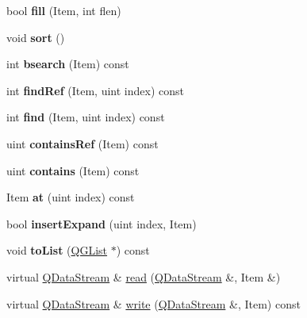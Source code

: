\begin{DoxyCompactItemize}
\item 
\hypertarget{class_q_g_vector_af9dcbef812d6f8dd7a6390cdead99a96}{bool {\bfseries fill} (Item, int flen)}\label{class_q_g_vector_af9dcbef812d6f8dd7a6390cdead99a96}

\item 
\hypertarget{class_q_g_vector_a47fdc9eea42b6975cdc835bb2e08810e}{void {\bfseries sort} ()}\label{class_q_g_vector_a47fdc9eea42b6975cdc835bb2e08810e}

\item 
\hypertarget{class_q_g_vector_a4d620afb19f972621dd2c276bfa7aa47}{int {\bfseries bsearch} (Item) const }\label{class_q_g_vector_a4d620afb19f972621dd2c276bfa7aa47}

\item 
\hypertarget{class_q_g_vector_ac88a052b06ba7050cf146f06ccb80981}{int {\bfseries find\-Ref} (Item, uint index) const }\label{class_q_g_vector_ac88a052b06ba7050cf146f06ccb80981}

\item 
\hypertarget{class_q_g_vector_a87e5b0a8391a6f8f3ea0f4019970ad6f}{int {\bfseries find} (Item, uint index) const }\label{class_q_g_vector_a87e5b0a8391a6f8f3ea0f4019970ad6f}

\item 
\hypertarget{class_q_g_vector_af5fa25c58c8c12a0f619e3a0d3a1c2fd}{uint {\bfseries contains\-Ref} (Item) const }\label{class_q_g_vector_af5fa25c58c8c12a0f619e3a0d3a1c2fd}

\item 
\hypertarget{class_q_g_vector_aeea75e0704a1e19f64d31524d8d071b6}{uint {\bfseries contains} (Item) const }\label{class_q_g_vector_aeea75e0704a1e19f64d31524d8d071b6}

\item 
\hypertarget{class_q_g_vector_a2e4350ee269e6b3e1163f8900b6dcaa4}{Item {\bfseries at} (uint index) const }\label{class_q_g_vector_a2e4350ee269e6b3e1163f8900b6dcaa4}

\item 
\hypertarget{class_q_g_vector_a0593f5d2e2a819bc5833e2f712dc8dd2}{bool {\bfseries insert\-Expand} (uint index, Item)}\label{class_q_g_vector_a0593f5d2e2a819bc5833e2f712dc8dd2}

\item 
\hypertarget{class_q_g_vector_a6f25011ce752ae7a97effcf72993cb93}{void {\bfseries to\-List} (\hyperlink{class_q_g_list}{Q\-G\-List} $\ast$) const }\label{class_q_g_vector_a6f25011ce752ae7a97effcf72993cb93}

\item 
virtual \hyperlink{class_q_data_stream}{Q\-Data\-Stream} \& \hyperlink{class_q_g_vector_ad2158ff020e4b3a5832f58cb41ea435e}{read} (\hyperlink{class_q_data_stream}{Q\-Data\-Stream} \&, Item \&)
\item 
virtual \hyperlink{class_q_data_stream}{Q\-Data\-Stream} \& \hyperlink{class_q_g_vector_a8388bf83f18728933f34d6ee9eebcc7f}{write} (\hyperlink{class_q_data_stream}{Q\-Data\-Stream} \&, Item) const 
\end{DoxyCompactItemize}
